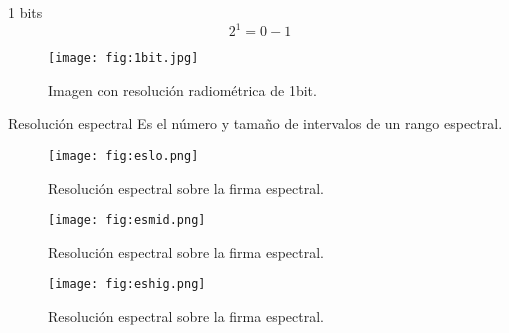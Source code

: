 
\begin{frame}{}
  \begin{block}{1 bits}
   \begin{equation}
            2^1 = 0-1
        \end{equation}
  \end{block}
\end{frame}


\begin{frame}{}
  \begin{figure}
    \centering
    \texttt{[image: fig:1bit.jpg]}
    \caption{Imagen con resolución radiométrica de 1bit.}
    \label{}
  \end{figure}
\end{frame}



\begin{frame}{}
    \begin{block}{Resolución espectral}
        Es el número y tamaño de intervalos de un rango espectral.
    \end{block}
\end{frame}

\begin{frame}{}
  \begin{figure}
    \centering
    \texttt{[image: fig:eslo.png]}
    \caption{Resolución espectral sobre la firma espectral.}
    \label{}
  \end{figure}
\end{frame}

\begin{frame}{}
  \begin{figure}
    \centering
    \texttt{[image: fig:esmid.png]}
    \caption{Resolución espectral sobre la firma espectral.}
    \label{}
  \end{figure}
\end{frame}

\begin{frame}{}
  \begin{figure}
    \centering
    \texttt{[image: fig:eshig.png]}
    \caption{Resolución espectral sobre la firma espectral.}
    \label{}
  \end{figure}
\end{frame}

